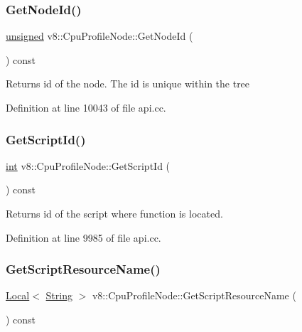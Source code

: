 \subsubsection{\texorpdfstring{Get\+Node\+Id()}{GetNodeId()}}
{\footnotesize\ttfamily \mbox{\hyperlink{classunsigned}{unsigned}} v8\+::\+Cpu\+Profile\+Node\+::\+Get\+Node\+Id (\begin{DoxyParamCaption}{ }\end{DoxyParamCaption}) const}

Returns id of the node. The id is unique within the tree 

Definition at line 10043 of file api.\+cc.

\mbox{\label{classv8_1_1CpuProfileNode_aef0b693911218f14745f2c51b4c9a860}} 
\subsubsection{\texorpdfstring{Get\+Script\+Id()}{GetScriptId()}}
{\footnotesize\ttfamily \mbox{\hyperlink{classint}{int}} v8\+::\+Cpu\+Profile\+Node\+::\+Get\+Script\+Id (\begin{DoxyParamCaption}{ }\end{DoxyParamCaption}) const}

Returns id of the script where function is located. 

Definition at line 9985 of file api.\+cc.

\mbox{\label{classv8_1_1CpuProfileNode_aad0267a1f129380164bb9eff18ea60a7}} 
\subsubsection{\texorpdfstring{Get\+Script\+Resource\+Name()}{GetScriptResourceName()}}
{\footnotesize\ttfamily \mbox{\hyperlink{classv8_1_1Local}{Local}}$<$ \mbox{\hyperlink{classv8_1_1String}{String}} $>$ v8\+::\+Cpu\+Profile\+Node\+::\+Get\+Script\+Resource\+Name (\begin{DoxyParamCaption}{ }\end{DoxyParamCaption}) const}

